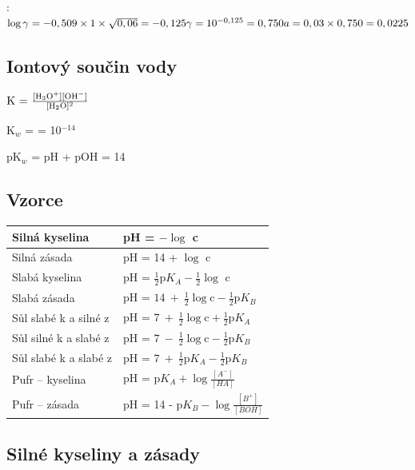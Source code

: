 :\\
$\log\gamma = -0,509\times1\times\sqrt{0,06} = -0,125\\
\gamma = 10^{-0,125} = 0,750\\
a = 0,03\times0,750 = 0,0225$

\newpage

\subsection{Iontový součin vody}

$\textrm{K = }\frac{[\ce{H3O+}][\ce{OH-}]}{[\ce{H2O}]^2}$

K$_w$ = \ce{[H3O+][OH-]} = 10$^{-14}$

pK$_w$ = pH + pOH = 14

\subsection{Vzorce}

\begin{tabular}{ll}
	Silná kyselina & pH = $-\log$ c \\\hline
	Silná zásada & pH = 14 + $\log$ c \\\hline
	Slabá kyselina & pH = $\frac{1}{2}\textrm{p}K_A-\frac{1}{2}\log$ c \\\hline
	Slabá zásada & pH = $14\ +\ \frac{1}{2}\log\textrm{c} - \frac{1}{2}\textrm{p}K_B$ \\\hline
	Sůl slabé k a silné z & pH = $7\ +\ \frac{1}{2}\log\textrm{c} + \frac{1}{2}\textrm{p}K_A$ \\\hline
	Sůl silné k a slabé z & pH = $7\ -\ \frac{1}{2}\log\textrm{c} - \frac{1}{2}\textrm{p}K_B$ \\\hline
	Sůl slabé k a slabé z & pH = $7\ +\ \frac{1}{2}\textrm{p}K_A - \frac{1}{2}\textrm{p}K_B$ \\\hline
	Pufr -- kyselina & pH = $\textrm{p}K_A + \log \frac{[A^-]}{[HA]}$ \\\hline
	Pufr -- zásada & pH = 14 - $\textrm{p}K_B - \log \frac{[B^+]}{[BOH]}$ \\
\end{tabular}

\subsection{Silné kyseliny a zásady}

